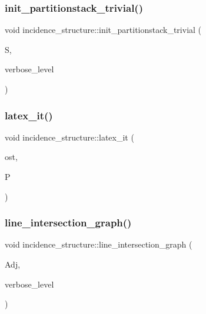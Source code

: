 \mbox{\label{classincidence__structure_a1ef40a989dce94be003b922c826926c0}} 
\subsubsection{\texorpdfstring{init\+\_\+partitionstack\+\_\+trivial()}{init\_partitionstack\_trivial()}}
{\footnotesize\ttfamily void incidence\+\_\+structure\+::init\+\_\+partitionstack\+\_\+trivial (\begin{DoxyParamCaption}\item[{\mbox{\hyperlink{classpartitionstack}{partitionstack}} $\ast$}]{S,  }\item[{\mbox{\hyperlink{galois_8h_a09fddde158a3a20bd2dcadb609de11dc}{I\+NT}}}]{verbose\+\_\+level }\end{DoxyParamCaption})}

\mbox{\label{classincidence__structure_a7ad3d823093d5938d41c36230b9b8ea6}} 
\subsubsection{\texorpdfstring{latex\+\_\+it()}{latex\_it()}}
{\footnotesize\ttfamily void incidence\+\_\+structure\+::latex\+\_\+it (\begin{DoxyParamCaption}\item[{ostream \&}]{ost,  }\item[{\mbox{\hyperlink{classpartitionstack}{partitionstack}} \&}]{P }\end{DoxyParamCaption})}

\mbox{\label{classincidence__structure_a477ba3c41db7791eda9ddc85fa2de273}} 
\subsubsection{\texorpdfstring{line\+\_\+intersection\+\_\+graph()}{line\_intersection\_graph()}}
{\footnotesize\ttfamily void incidence\+\_\+structure\+::line\+\_\+intersection\+\_\+graph (\begin{DoxyParamCaption}\item[{\mbox{\hyperlink{galois_8h_a09fddde158a3a20bd2dcadb609de11dc}{I\+NT}} $\ast$}]{Adj,  }\item[{\mbox{\hyperlink{galois_8h_a09fddde158a3a20bd2dcadb609de11dc}{I\+NT}}}]{verbose\+\_\+level }\end{DoxyParamCaption})}

